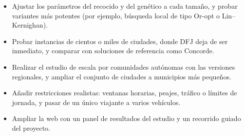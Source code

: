 \begin{itemize}
  \item Ajustar los parámetros del recocido y del genético a cada tamaño, y probar variantes más potentes (por ejemplo, búsqueda local de tipo Or-opt o Lin--Kernighan).
  \item Probar instancias de cientos o miles de ciudades, donde DFJ deja de ser inmediato, y comparar con soluciones de referencia como Concorde.
  \item Realizar el estudio de escala por comunidades autónomas con las versiones regionales, y ampliar el conjunto de ciudades a municipios más pequeños.
  \item Añadir restricciones realistas: ventanas horarias, peajes, tráfico o límites de jornada, y pasar de un único viajante a varios vehículos.
  \item Ampliar la web con un panel de resultados del estudio y un recorrido guiado del proyecto.
\end{itemize}
